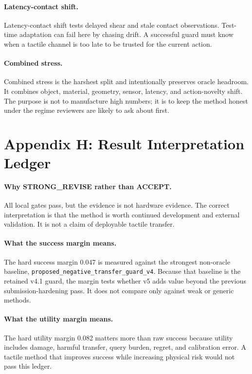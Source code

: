 \documentclass{article}
\begin{document}
\paragraph{Latency-contact shift.}
Latency-contact shift tests delayed shear and stale contact observations. Test-time adaptation can fail here by chasing drift. A successful guard must know when a tactile channel is too late to be trusted for the current action.

\paragraph{Combined stress.}
Combined stress is the harshest split and intentionally preserves oracle headroom. It combines object, material, geometry, sensor, latency, and action-novelty shift. The purpose is not to manufacture high numbers; it is to keep the method honest under the regime reviewers are likely to ask about first.

\clearpage
\section{Appendix H: Result Interpretation Ledger}
\paragraph{Why STRONG\_REVISE rather than ACCEPT.}
All local gates pass, but the evidence is not hardware evidence. The correct interpretation is that the method is worth continued development and external validation. It is not a claim of deployable tactile transfer.

\paragraph{What the success margin means.}
The hard success margin 0.047 is measured against the strongest non-oracle baseline, \texttt{proposed\_negative\_transfer\_guard\_v4}. Because that baseline is the retained v4.1 guard, the margin tests whether v5 adds value beyond the previous submission-hardening pass. It does not compare only against weak or generic methods.

\paragraph{What the utility margin means.}
The hard utility margin 0.082 matters more than raw success because utility includes damage, harmful transfer, query burden, regret, and calibration error. A tactile method that improves success while increasing physical risk would not pass this ledger.
\end{document}
